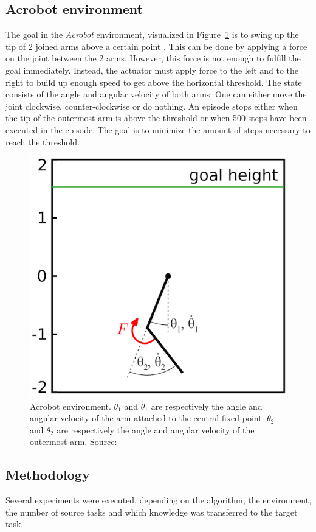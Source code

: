 \subsection{Acrobot environment} %
\label{sub:acrobot_environment}
The goal in the \textit{Acrobot} environment, visualized in Figure~\ref{fig:acrobot} is to swing up  the tip of 2 joined arms above a certain point \cite{spong1995swing}.
This can be done by applying a force on the joint between the 2 arms.
However, this force is not enough to fulfill the goal immediately. Instead, the actuator must apply force to the left and to the right to build up enough speed to get above the horizontal threshold.
The state consists of the angle and angular velocity of both arms. One can either move the joint clockwise, counter-clockwise or do nothing.
An episode stops either when the tip of the outermost arm is above the threshold or when 500 steps have been executed in the episode.
The goal is to minimize the amount of steps necessary to reach the threshold.
\begin{figure}[htb]
    \centering
    \includegraphics[width=.7\linewidth]{images/acrobot.png}
    \caption[Acrobot environment]{Acrobot environment. $\theta_1$ and $\dot{\theta_1}$ are respectively the angle and angular velocity of the arm attached to the central fixed point. $\theta_2$ and $\dot{\theta_2}$ are respectively the angle and angular velocity of the outermost arm. Source: \cite{fremaux2013reinforcement}}
    \label{fig:acrobot}
\end{figure}

\subsection{Methodology} %
\label{sub:methodology}
Several experiments were executed, depending on the algorithm, the environment, the number of source tasks and which knowledge was transferred to the target task.\\

